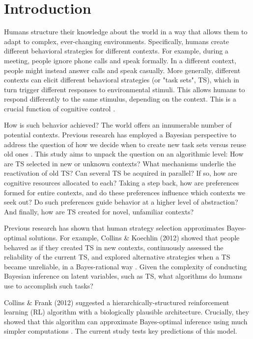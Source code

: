 \documentclass[10pt, letterpaper]{article}
\begin{document}
\section{Introduction}

Humans structure their knowledge about the world in a way that allows them to adapt to complex, ever-changing environments. Specifically, humans create different behavioral strategies for different contexts. For example, during a meeting, people ignore phone calls and speak formally. In a different context, people might instead answer calls and speak casually. More generally, different contexts can elicit different behavioral strategies (or "task sets", TS), which in turn trigger different responses to environmental stimuli. This allows humans to respond differently to the same stimulus, depending on the context. This is a crucial function of cognitive control \cite{miller_integrative_2001}.

How is such behavior achieved? The world offers an innumerable number of potential contexts. Previous research has employed a Bayesian perspective to address the question of how we decide when to create new task sets versus reuse old ones \cite{collins_reasoning_2012}. This study aims to unpack the question on an algorithmic level: How are TS selected in new or unknown contexts? What mechanisms underlie the reactivation of old TS? Can several TS be acquired in parallel? If so, how are cognitive resources allocated to each? Taking a step back, how are preferences formed for entire contexts, and do these preferences influence which contexts we seek out? Do such preferences guide behavior at a higher level of abstraction? And finally, how are TS created for novel, unfamiliar contexts? 

Previous research has shown that human strategy selection approximates Bayes-optimal solutions. For example, Collins \& Koechlin (2012) showed that people behaved as if they created TS in new contexts, continuously assessed the reliability of the current TS, and explored alternative strategies when a TS became unreliable, in a Bayes-rational way \cite{collins_reasoning_2012, donoso_foundations_2014}. Given the complexity of conducting Bayesian inference on latent variables, such as TS, what algorithms do humans use to accomplish such tasks?

Collins \& Frank (2012) suggested a hierarchically-structured reinforcement learning (RL) algorithm with a biologically plausible architecture. Crucially, they showed that this algorithm can approximate Bayes-optimal inference using much simpler computations \cite{collins_cognitive_2013}. The current study tests key predictions of this model.
\end{document}

